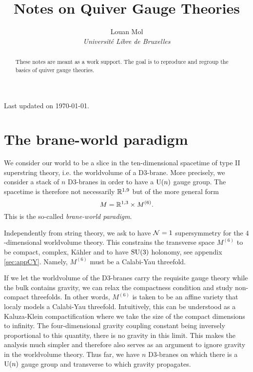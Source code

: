 \documentclass[a4paper,11pt]{article}
\title{\textbf{Notes on Quiver Gauge Theories}}
\author{Louan Mol\\ \textit{Université Libre de Bruxelles}}
\date{}
\begin{document}
\begin{titlepage}
    
    \maketitle

    \thispagestyle{empty}

    \vspace{2cm}

    \begin{abstract}
        These notes are meant as a work support. The goal is to reproduce and regroup the basics of quiver gauge theories. 
    \end{abstract}

    \vfill

    \hfill Last updated on \today.
    
\end{titlepage}
  
\pagebreak

\tableofcontents

\pagebreak

\nocite{*}

\section{The brane-world paradigm}

    We consider our world to be a slice in the ten-dimensional spacetime of type II superstring theory, i.e. the worldvolume of a D$3$-brane. More precisely, we consider a stack of $n$ D$3$-branes in order to have a $\text{U}(n)$ gauge group. The spacetime is therefore not necessarily $\mathbb{R}^{1,9}$ but of the more general form
    \begin{equation*}
        M = \mathbb{R}^{1,3}\times M^{(6)}.
    \end{equation*}
    This is the so-called \emph{brane-world paradigm}.
    
    Independently from string theory, we ask to have $\mathcal{N}=1$ supersymmetry for the $4$-dimensional worldvolume theory. This constrains the transverse space $M^{(6)}$ to be compact, complex, Kähler and to have $\text{SU}(3)$ holonomy, see appendix \ref{sec:appCY}. Namely, $M^{(6)}$ must be a Calabi-Yau threefold.
    
    If we let the worldvolume of the D$3$-branes carry the requisite gauge theory while the bulk contains gravity, we can relax the compactness condition and study non-compact threefolds. In other words, $M^{(6)}$ is taken to be an affine variety that localy models a Calabi-Yau threefold. Intuitively, this can be understood as a Kaluza-Klein compactification where we take the size of the compact dimensions to infinity. The four-dimensional gravity coupling constant being inversely proportional to this quantity, there is no gravity in this limit. This makes the analysis much simpler and therefore also serves as an argument to ignore gravity in the worldvolume theory. Thus far, we have $n$ D$3$-branes on which there is a $\text{U}(n)$ gauge group and transverse to which gravity propagates.
\end{document}
